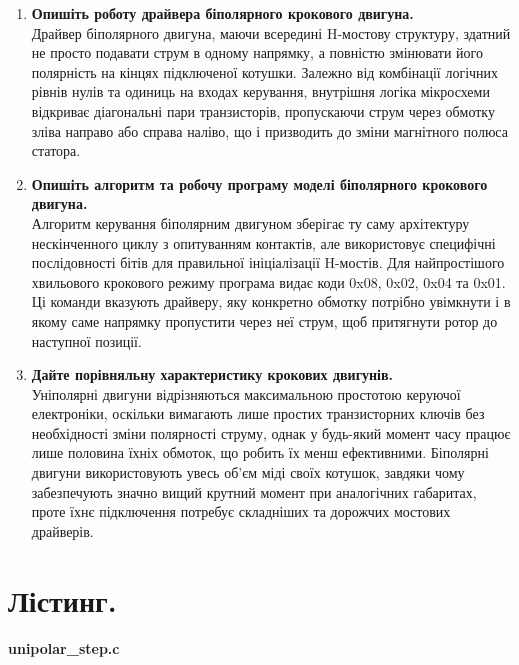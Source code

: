 \documentclass[14pt, a4paper]{extreport}
\begin{document}
\begin{enumerate}
		\item \textbf{Опишіть роботу драйвера біполярного крокового двигуна.} \\ Драйвер біполярного двигуна, маючи всередині H-мостову структуру, здатний не просто подавати струм в одному напрямку, а повністю змінювати його полярність на кінцях підключеної котушки. Залежно від комбінації логічних рівнів нулів та одиниць на входах керування, внутрішня логіка мікросхеми відкриває діагональні пари транзисторів, пропускаючи струм через обмотку зліва направо або справа наліво, що і призводить до зміни магнітного полюса статора.
		
		\item \textbf{Опишіть алгоритм та робочу програму моделі біполярного крокового двигуна.} \\ Алгоритм керування біполярним двигуном зберігає ту саму архітектуру нескінченного циклу з опитуванням контактів, але використовує специфічні послідовності бітів для правильної ініціалізації H-мостів. Для найпростішого хвильового крокового режиму програма видає коди 0x08, 0x02, 0x04 та 0x01. Ці команди вказують драйверу, яку конкретно обмотку потрібно увімкнути і в якому саме напрямку пропустити через неї струм, щоб притягнути ротор до наступної позиції.
		
		\item \textbf{Дайте порівняльну характеристику крокових двигунів.} \\ Уніполярні двигуни відрізняються максимальною простотою керуючої електроніки, оскільки вимагають лише простих транзисторних ключів без необхідності зміни полярності струму, однак у будь-який момент часу працює лише половина їхніх обмоток, що робить їх менш ефективними. Біполярні двигуни використовують увесь об'єм міді своїх котушок, завдяки чому забезпечують значно вищий крутний момент при аналогічних габаритах, проте їхнє підключення потребує складніших та дорожчих мостових драйверів.
	\end{enumerate}
	
	\pagebreak
	
	\section*{Лістинг.}
	
	\textbf{unipolar\_step.c}
	
\end{document}
